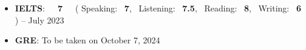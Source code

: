 
\vspace{5pt}
\begin{itemize}
  \item \textbf{IELTS}:\ \ \ \textbf{7}\ \ \ ( Speaking: \ \textbf{7}, \ Listening: \ \textbf{7.5}, \ Reading: \ \textbf{8}, \ Writing: \ \textbf{6} ) --  July 2023
  \item \textbf{GRE}: To be taken on October 7, 2024
\end{itemize}

